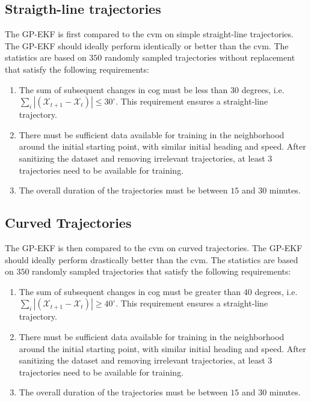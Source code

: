 \subsection{Straigth-line trajectories}
The GP-EKF is first compared to the \acrshort{cvm} on simple straight-line trajectories. The GP-EKF should ideally perform identically or better than the \acrshort{cvm}.
The statistics are based on $350$ randomly sampled trajectories without replacement that satisfy the following requirements:
\begin{enumerate}
    \item The sum of subsequent changes in \acrshort{cog} must be less than $30$ degrees, i.e. $\sum_i |(\mathcal{X}_{t+1} - \mathcal{X}_t)| \leq 30^\circ$. This requirement ensures a straight-line trajectory.
    \item There must be sufficient data available for training in the neighborhood around the initial starting point, with similar initial heading and speed. After sanitizing the dataset and removing irrelevant trajectories, at least $3$ trajectories need to be available for training.
    \item The overall duration of the trajectories must be between $15$ and $30$ minutes.
\end{enumerate}




\subsection{Curved Trajectories}
The GP-EKF is then compared to the \acrshort{cvm} on curved trajectories. The GP-EKF should ideally perform drastically better than the \acrshort{cvm}.
The statistics are based on $350$ randomly sampled trajectories that satisfy the following requirements:
\begin{enumerate}
    \item The sum of subsequent changes in \acrshort{cog} must be greater than $40$ degrees, i.e. $\sum_i |(\mathcal{X}_{t+1} - \mathcal{X}_t)| \geq 40^\circ$. This requirement ensures a straight-line trajectory.
    \item There must be sufficient data available for training in the neighborhood around the initial starting point, with similar initial heading and speed. After sanitizing the dataset and removing irrelevant trajectories, at least $3$ trajectories need to be available for training.
    \item The overall duration of the trajectories must be between $15$ and $30$ minutes.
\end{enumerate}


